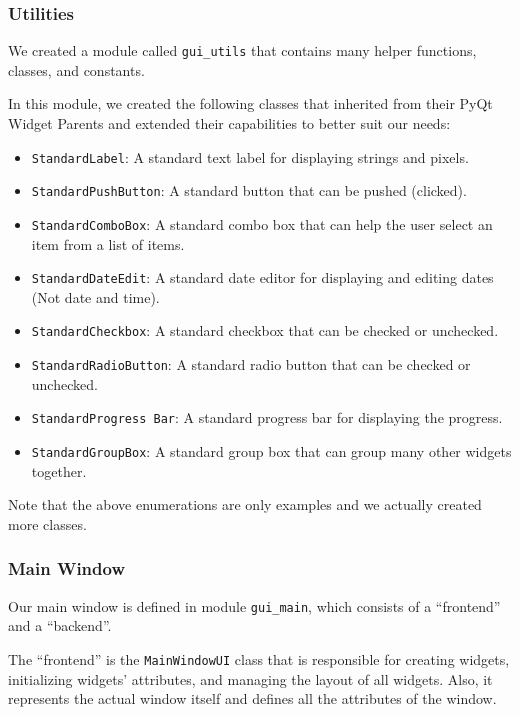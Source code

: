 \documentclass[fontsize=11pt]{article}
\begin{document}
    \subsubsection{Utilities}

    We created a module called \verb|gui_utils| that contains many helper functions, classes, and constants.

    In this module, we created the following classes that inherited from their PyQt Widget Parents and extended their capabilities to better suit our needs:

    \begin{itemize}
        \item \verb|StandardLabel|: A standard text label for displaying strings and pixels.
        \item \verb|StandardPushButton|: A standard button that can be pushed (clicked).
        \item \verb|StandardComboBox|: A standard combo box that can help the user select an item from a list of items.
        \item \verb|StandardDateEdit|: A standard date editor for displaying and editing dates (Not date and time).
        \item \verb|StandardCheckbox|: A standard checkbox that can be checked or unchecked.
        \item \verb|StandardRadioButton|: A standard radio button that can be checked or unchecked.
        \item \verb|StandardProgress Bar|: A standard progress bar for displaying the progress.
        \item \verb|StandardGroupBox|: A standard group box that can group many other widgets together.
    \end{itemize}

    Note that the above enumerations are only examples and we actually created more classes.

    \subsubsection{Main Window}

    Our main window is defined in module \verb|gui_main|, which consists of a ``frontend'' and a ``backend''.

    The ``frontend'' is the \verb|MainWindowUI| class that is responsible for creating widgets, initializing widgets' attributes, and managing the layout of all widgets. Also, it represents the actual window itself and defines all the attributes of the window.
\end{document}
